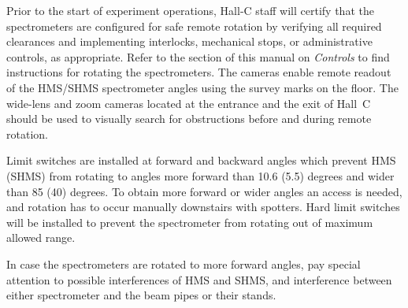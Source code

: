 {Prior to the start of experiment operations, Hall-C staff will certify that the spectrometers
are configured for safe remote rotation by verifying all required clearances and
implementing interlocks, mechanical stops, or administrative controls, as appropriate.
Refer to the section of this manual on \emph{Controls} to find instructions for
rotating the spectrometers. The cameras enable remote readout of the HMS/SHMS 
spectrometer angles using the survey marks on the floor.
The wide-lens and zoom cameras located at the entrance and
the exit of Hall~C should be used to visually search for obstructions
before and during remote rotation.

Limit switches are installed at forward
and backward angles which prevent HMS (SHMS) from rotating to angles more forward than
10.6 (5.5) degrees and wider than 85 (40) degrees. To obtain more forward or wider
angles an access is needed, and rotation has to occur manually
downstairs with spotters. Hard limit switches will be installed to prevent
the spectrometer from rotating out of maximum allowed range.

In case the spectrometers are rotated to more forward angles, pay special
attention to possible interferences of HMS and SHMS, and interference between either
spectrometer and the beam pipes or their stands. 

%
%


}
